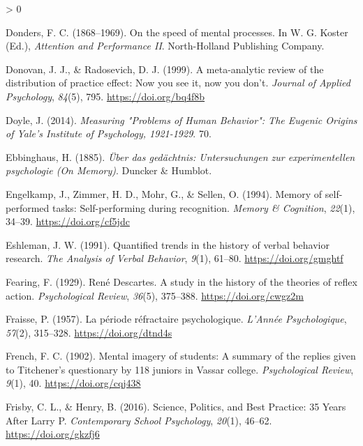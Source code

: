 \documentclass[
  oneside,
  12pt]{crumpbook}
\newlength{\cslhangindent}
\newenvironment{CSLReferences}[2] %
 {%
  \setlength{\parindent}{0pt}
  \ifodd #1 \everypar{\setlength{\hangindent}{\cslhangindent}}\ignorespaces\fi
  \ifnum #2 > 0
  \setlength{\parskip}{#2\baselineskip}
  \fi
 }%
 {}
\begin{document}
\begin{CSLReferences}{1}{0}
\leavevmode\hypertarget{ref-dondersSpeedMentalProcesses1868}{}%
Donders, F. C. (1868--1969). On the speed of mental processes. In W. G. Koster (Ed.), \emph{Attention and {Performance II}}. {North-Holland Publishing Company}.

\leavevmode\hypertarget{ref-donovanMetaanalyticReviewDistribution1999}{}%
Donovan, J. J., \& Radosevich, D. J. (1999). A meta-analytic review of the distribution of practice effect: {Now} you see it, now you don't. \emph{Journal of Applied Psychology}, \emph{84}(5), 795. \url{https://doi.org/bq4f8b}

\leavevmode\hypertarget{ref-doyleMeasuringProblemsHuman2014}{}%
Doyle, J. (2014). \emph{Measuring "{Problems} of {Human Behavior}": {The Eugenic Origins} of {Yale}'s {Institute} of {Psychology}, 1921-1929}. 70.

\leavevmode\hypertarget{ref-ebbinghausUberGedachtnisUntersuchungen1885}{}%
Ebbinghaus, H. (1885). \emph{Über das gedächtnis: Untersuchungen zur experimentellen psychologie ({On Memory})}. {Duncker \& Humblot}.

\leavevmode\hypertarget{ref-engelkampMemorySelfperformedTasks1994}{}%
Engelkamp, J., Zimmer, H. D., Mohr, G., \& Sellen, O. (1994). Memory of self-performed tasks: {Self}-performing during recognition. \emph{Memory \& Cognition}, \emph{22}(1), 34--39. \url{https://doi.org/cf5jdc}

\leavevmode\hypertarget{ref-eshlemanQuantifiedTrendsHistory1991}{}%
Eshleman, J. W. (1991). Quantified trends in the history of verbal behavior research. \emph{The Analysis of Verbal Behavior}, \emph{9}(1), 61--80. \url{https://doi.org/gmghtf}

\leavevmode\hypertarget{ref-fearingReneDescartesStudy1929}{}%
Fearing, F. (1929). René {Descartes}. {A} study in the history of the theories of reflex action. \emph{Psychological Review}, \emph{36}(5), 375--388. \url{https://doi.org/cwgz2m}

\leavevmode\hypertarget{ref-fraissePeriodeRefractairePsychologique1957}{}%
Fraisse, P. (1957). La période réfractaire psychologique. \emph{L'Année Psychologique}, \emph{57}(2), 315--328. \url{https://doi.org/dtnd4s}

\leavevmode\hypertarget{ref-frenchMentalImageryStudents1902}{}%
French, F. C. (1902). Mental imagery of students: {A} summary of the replies given to {Titchener}'s questionary by 118 juniors in {Vassar} college. \emph{Psychological Review}, \emph{9}(1), 40. \url{https://doi.org/cqj438}

\leavevmode\hypertarget{ref-frisbySciencePoliticsBest2016}{}%
Frisby, C. L., \& Henry, B. (2016). Science, {Politics}, and {Best Practice}: 35 {Years After Larry P}. \emph{Contemporary School Psychology}, \emph{20}(1), 46--62. \url{https://doi.org/gkzfj6}


\end{CSLReferences}
\end{document}
